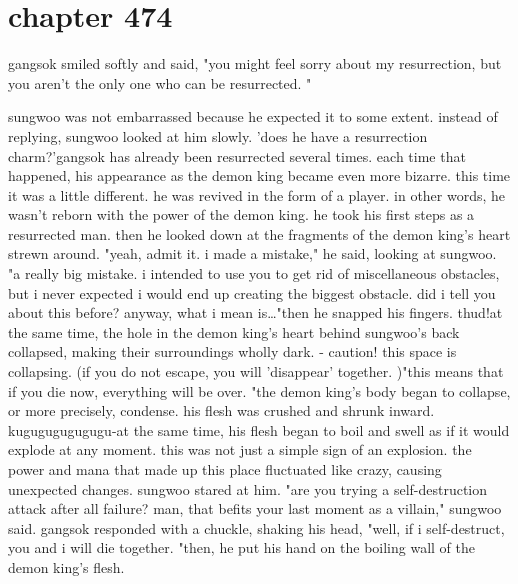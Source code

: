 \section{chapter 474}

gangsok smiled softly and said, "you might feel sorry about my resurrection, but you aren't the only one who can be resurrected.
"




sungwoo was not embarrassed because he expected it to some extent.
 instead of replying, sungwoo looked at him slowly.
'does he have a resurrection charm?'gangsok has already been resurrected several times.
 each time that happened, his appearance as the demon king became even more bizarre.
 this time it was a little different.
 he was revived in the form of a player.
 in other words, he wasn't reborn with the power of the demon king.
 he took his first steps as a resurrected man.
 then he looked down at the fragments of the demon king's heart strewn around.
"yeah, admit it.
 i made a mistake," he said, looking at sungwoo.
 "a really big mistake.
 i intended to use you to get rid of miscellaneous obstacles, but i never expected i would end up creating the biggest obstacle.
 did i tell you about this before? anyway, what i mean is…"then he snapped his fingers.
thud!at the same time, the hole in the demon king's heart behind sungwoo's back collapsed, making their surroundings wholly dark.
- caution! this space is collapsing.
 (if you do not escape, you will 'disappear' together.
)"this means that if you die now, everything will be over.
"the demon king's body began to collapse, or more precisely, condense.
 his flesh was crushed and shrunk inward.
kugugugugugugu-at the same time, his flesh began to boil and swell as if it would explode at any moment.
this was not just a simple sign of an explosion.
 the power and mana that made up this place fluctuated like crazy, causing unexpected changes.
sungwoo stared at him.
"are you trying a self-destruction attack after all failure? man, that befits your last moment as a villain," sungwoo said.
 gangsok responded with a chuckle, shaking his head, "well, if i self-destruct, you and i will die together.
"then, he put his hand on the boiling wall of the demon king's flesh.

